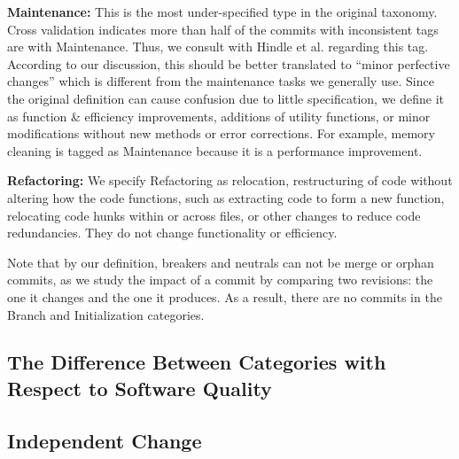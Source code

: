 \textbf{Maintenance:} This is the most under-specified type in the original taxonomy.
Cross validation indicates more than half of the commits with inconsistent tags are with Maintenance. 
Thus, we consult with Hindle et al. regarding this tag.
According to our discussion, this should be better translated to ``minor perfective changes'' which is different from the maintenance tasks we generally use.
Since the original definition can cause confusion due to little specification, we define it as function \& efficiency improvements, additions of utility functions, or minor modifications without new methods or error corrections.
For example, memory cleaning is tagged as Maintenance because it is a performance improvement. 


\textbf{Refactoring:} 
We specify Refactoring as relocation, restructuring of code without altering how the code functions, such as extracting code to form a new function, relocating code hunks within or across files, or other changes to reduce code redundancies.
They do not change functionality or efficiency.

Note that by our definition, breakers and neutrals can not be merge or orphan commits, as we study the impact of a commit by comparing two revisions: the one it changes and the one it produces.
As a result, there are no commits in the Branch and Initialization categories.
\subsection{The Difference Between Categories with Respect to Software Quality}


\subsection{Independent Change}


